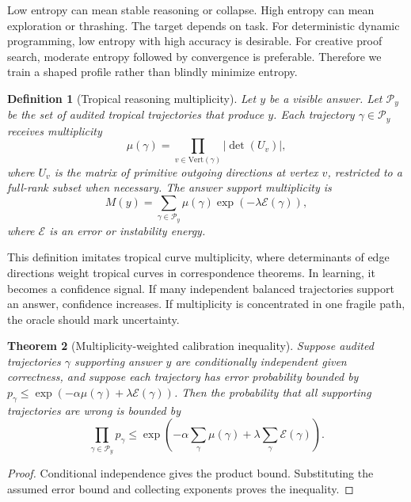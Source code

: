 \documentclass[11pt]{article}
\newtheorem{definition}{Definition}[section]
\newtheorem{theorem}[definition]{Theorem}
\newcommand{\calE}{\mathcal{E}}
\newcommand{\calP}{\mathcal{P}}
\newcommand{\abs}[1]{\left\lvert #1\right\rvert}
\begin{document}
Low entropy can mean stable reasoning or collapse.  High entropy can mean exploration or thrashing.  The target depends on task.  For deterministic dynamic programming, low entropy with high accuracy is desirable.  For creative proof search, moderate entropy followed by convergence is preferable.  Therefore we train a shaped profile rather than blindly minimize entropy.

\begin{definition}[Tropical reasoning multiplicity]
Let \(y\) be a visible answer.  Let \(\calP_y\) be the set of audited tropical trajectories that produce \(y\).  Each trajectory \(\gamma\in\calP_y\) receives multiplicity
\begin{equation}
\mu(\gamma)=\prod_{v\in\mathrm{Vert}(\gamma)} \abs{\det(U_v)},
\end{equation}
where \(U_v\) is the matrix of primitive outgoing directions at vertex \(v\), restricted to a full-rank subset when necessary.  The answer support multiplicity is
\begin{equation}
M(y)=\sum_{\gamma\in\calP_y}\mu(\gamma)\exp(-\lambda\calE(\gamma)),
\end{equation}
where \(\calE\) is an error or instability energy.
\end{definition}

This definition imitates tropical curve multiplicity, where determinants of edge directions weight tropical curves in correspondence theorems.  In learning, it becomes a confidence signal.  If many independent balanced trajectories support an answer, confidence increases.  If multiplicity is concentrated in one fragile path, the oracle should mark uncertainty.

\begin{theorem}[Multiplicity-weighted calibration inequality]
Suppose audited trajectories \(\gamma\) supporting answer \(y\) are conditionally independent given correctness, and suppose each trajectory has error probability bounded by \(p_\gamma\le \exp(-\alpha\mu(\gamma)+\lambda\calE(\gamma))\).  Then the probability that all supporting trajectories are wrong is bounded by
\begin{equation}
\prod_{\gamma\in\calP_y}p_\gamma\le \exp\left(-\alpha\sum_{\gamma}\mu(\gamma)+\lambda\sum_\gamma\calE(\gamma)\right).
\end{equation}
\end{theorem}

\begin{proof}
Conditional independence gives the product bound.  Substituting the assumed error bound and collecting exponents proves the inequality.
\end{proof}
\end{document}
